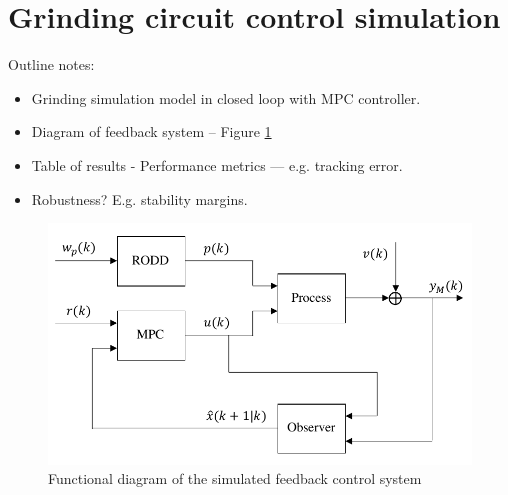 \section{Grinding circuit control simulation} \label{section:sim-ore-mimo-ctrl} 

Outline notes:
\begin{itemize}
	\item Grinding simulation model in closed loop with MPC controller.
	\item Diagram of feedback system – Figure \ref{fig:sim-mpc-diag}
	\item Table of results - Performance metrics — e.g. tracking error.
	\item Robustness?  E.g. stability margins.
\end{itemize}

\begin{figure}[htp]
	\centering
	\includegraphics[width=12cm]{images/sim-mpc-diag.pdf}
	\caption{Functional diagram of the simulated feedback control system}
	\label{fig:sim-mpc-diag}
\end{figure}